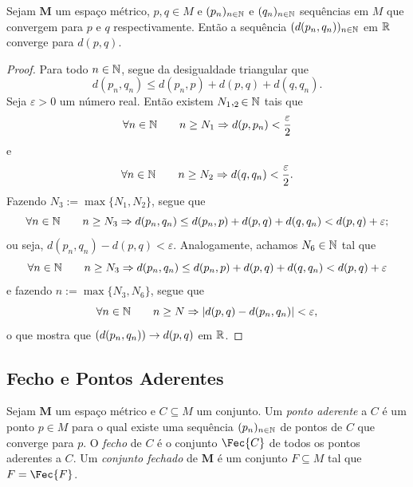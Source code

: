 \begin{prop}
Sejam $\bm M$ um espaço métrico, $p,q \in M$ e $(p_n)_{n \in \mathbb{N}}$ e $(q_n)_{n \in \mathbb{N}}$ sequências em $M$ que convergem para $p$ e $q$ respectivamente. Então a sequência $(d(p_n,q_n))_{n \in \mathbb{N}}$ em $\mathbb{R}$ converge para $d(p,q)$.
\end{prop}
\begin{proof}
	Para todo $n \in \mathbb{N}$, segue da desigualdade triangular que
	\begin{equation*}
	d(p_n,q_n) \leq d(p_n,p) + d(p,q) + d(q,q_n).
	\end{equation*}
Seja $\varepsilon > 0$ um número real. Então existem $N_1,_2 \in \mathbb{N}$ tais que
	\begin{equation*}
	\forall n \in \mathbb{N} \qquad n \geq N_1 \Rightarrow d(p,p_n) < \frac{\varepsilon}{2}
	\end{equation*}
e
	\begin{equation*}
	\forall n \in \mathbb{N} \qquad n \geq N_2 \Rightarrow d(q,q_n) < \frac{\varepsilon}{2}.
	\end{equation*}
Fazendo $N_3 := \max\{N_1,N_2\}$, segue que
	\begin{equation*}
	\forall n \in \mathbb{N} \qquad n \geq N_3 \Rightarrow d(p_n,q_n) \leq d(p_n,p) + d(p,q) + d(q,q_n) < d(p,q) + \varepsilon;
	\end{equation*}
ou seja, $d(p_n,q_n) - d(p,q) < \varepsilon$. Analogamente, achamos $N_6 \in \mathbb{N}$ tal que
	\begin{equation*}
	\forall n \in \mathbb{N} \qquad n \geq N_3 \Rightarrow d(p_n,q_n) \leq d(p_n,p) + d(p,q) + d(q,q_n) < d(p,q) + \varepsilon
	\end{equation*}
e fazendo $n := \max\{N_3,N_6\}$, segue que
	\begin{equation*}
	\forall n \in \mathbb{N} \qquad n \geq N \Rightarrow |d(p,q) - d(p_n,q_n)| < \varepsilon,
	\end{equation*}
o que mostra que $(d(p_n,q_n)) \rightarrow d(p,q)$ em $\mathbb{R}$.
	
\end{proof}

\subsection{Fecho e Pontos Aderentes}

\begin{defi}
Sejam $\bm M$ um espaço métrico e $C \subseteq M$ um conjunto. Um \emph{ponto aderente} a $C$ é um ponto $p \in M$ para o qual existe uma sequência $(p_n)_{n \in \mathbb{N}}$ de pontos de $C$ que converge para $p$. O \emph{fecho} de $C$ é o conjunto $\Fec{C}$ de todos os pontos aderentes a $C$. Um \emph{conjunto fechado} de $\bm M$ é um conjunto $F \subseteq M$ tal que $F = \Fec{F}$.
\end{defi}

